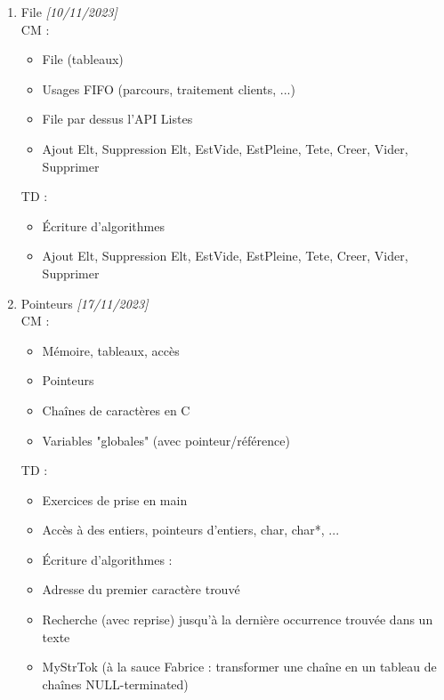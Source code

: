 \documentclass[11pt,a4paper]{article}
\begin{document}
\begin{enumerate}
\medskip

\item File \textit{[10/11/2023]}\\
  CM :
  \begin{itemize}
  \item File (tableaux)
  \item Usages FIFO (parcours, traitement clients, ...)
  \item File par dessus l'API Listes
  \item Ajout Elt, Suppression Elt, EstVide, EstPleine, Tete, Creer, Vider, Supprimer
  \end{itemize}
  TD :
  \begin{itemize}
  \item \'Ecriture d'algorithmes
  \item Ajout Elt, Suppression Elt, EstVide, EstPleine, Tete, Creer, Vider, Supprimer
  \end{itemize}

\medskip

\clearpage

\item Pointeurs \textit{[17/11/2023]}\\
  CM :
  \begin{itemize}
  \item Mémoire, tableaux, accès
  \item Pointeurs
  \item Chaînes de caractères en C
  \item Variables "globales" (avec pointeur/référence)
  \end{itemize}
  TD :
  \begin{itemize}
  \item Exercices de prise en main
  \item Accès à des entiers, pointeurs d'entiers, char, char*, ...
  \item \'Ecriture d'algorithmes :
  \item Adresse du premier caractère trouvé
  \item Recherche (avec reprise) jusqu'à la dernière occurrence trouvée dans un texte
  \item MyStrTok (à la sauce Fabrice : transformer une chaîne en un tableau de chaînes NULL-terminated)
  \end{itemize}

\medskip


\end{enumerate}
\end{document}
